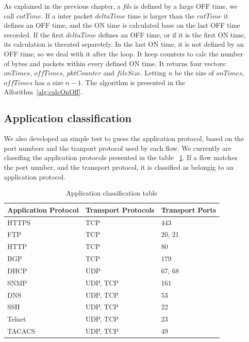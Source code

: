 As explained in the previous chapter, a \textit{file} is defined by a large OFF time, we call $cutTime$. If a inter packet $deltaTime$ time is larger than the $cutTime$ it defines an OFF time, and the ON time is calculated base on the last OFF time recorded. 
If the first $deltaTime$ defines an OFF time, or if it is the first ON time, its calculation is threated separetely. In the last ON time, it is not defined by an OFF time, so we deal with it after the loop. It keep counters to calc the number of bytes and packets within every defined ON time. It returns four vectors: $onTimes$, $offTimes$, $pktCounter$ and $fileSize$. Letting $n$ be the size of $onTimes$,  $offTimes$ has a size $n - 1$. The algorithm is presented in the Alforithm~\ref{alg:calcOnOff}.


\subsection{Application classification}


We also developed an simple test to guess the application protocol, based on the port numbers and the tranport protocol used by each flow. We currently are classifing the application protocols presented in the table ~\ref{tab:application-protocols}. If a flow matches the port number, and the transport protocol, it is classified as belongig to an application protocol.

\begin{table}[h!]
\centering
\caption{Application classification table}
\label{tab:application-protocols}
\begin{tabular}{lll}
\hline
Application Protocol & Transport Protocols & Transport Ports \\ \hline
HTTPS               & TCP                & 443             \\
FTP                 & TCP                & 20, 21          \\
HTTP                & TCP                & 80              \\
BGP                 & TCP                & 179             \\
DHCP                & UDP                & 67, 68          \\
SNMP                & UDP, TCP           & 161             \\
DNS                 & UDP, TCP           & 53              \\
SSH                 & UDP, TCP           & 22              \\
Telnet              & UDP, TCP           & 23              \\
TACACS              & UDP, TCP           & 49              \\ \hline
\end{tabular}
\end{table}




